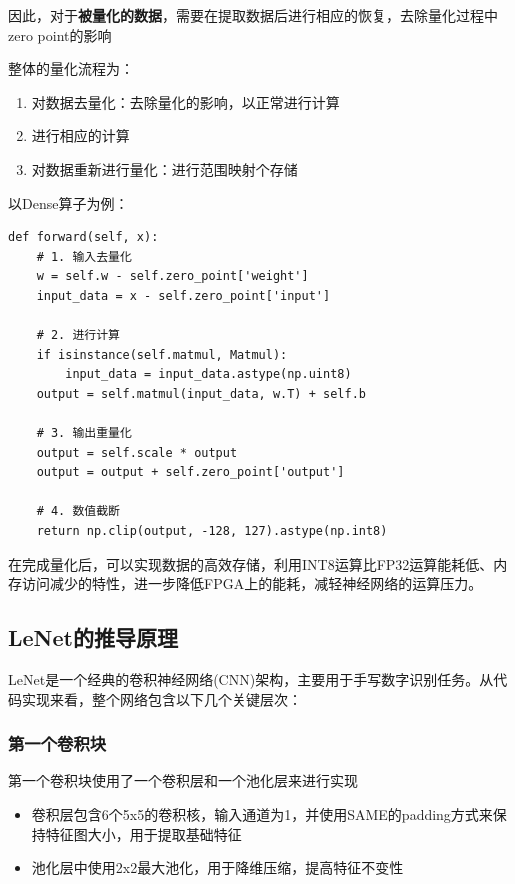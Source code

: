 \documentclass[12pt,a4paper]{article}
\begin{document}
因此，对于\textbf{被量化的数据}，需要在提取数据后进行相应的恢复，去除量化过程中zero
point的影响

整体的量化流程为：

\begin{enumerate}
\def\labelenumi{\arabic{enumi}.}
\item
  对数据去量化：去除量化的影响，以正常进行计算
\item
  进行相应的计算
\item
  对数据重新进行量化：进行范围映射个存储
\end{enumerate}

以Dense算子为例：

\begin{lstlisting}
def forward(self, x):
    # 1. 输入去量化
    w = self.w - self.zero_point['weight']
    input_data = x - self.zero_point['input']
    
    # 2. 进行计算
    if isinstance(self.matmul, Matmul):
        input_data = input_data.astype(np.uint8)
    output = self.matmul(input_data, w.T) + self.b
    
    # 3. 输出重量化
    output = self.scale * output
    output = output + self.zero_point['output']
    
    # 4. 数值截断
    return np.clip(output, -128, 127).astype(np.int8)
\end{lstlisting}

在完成量化后，可以实现数据的高效存储，利用INT8运算比FP32运算能耗低、内存访问减少的特性，进一步降低FPGA上的能耗，减轻神经网络的运算压力。

\subsection{LeNet的推导原理}

LeNet是一个经典的卷积神经网络(CNN)架构，主要用于手写数字识别任务。从代码实现来看，整个网络包含以下几个关键层次：

\subsubsection{第一个卷积块}

第一个卷积块使用了一个卷积层和一个池化层来进行实现

\begin{itemize}
\item
  卷积层包含6个5x5的卷积核，输入通道为1，并使用SAME的padding方式来保持特征图大小，用于提取基础特征
\item
  池化层中使用2x2最大池化，用于降维压缩，提高特征不变性
\end{itemize}
\end{document}
